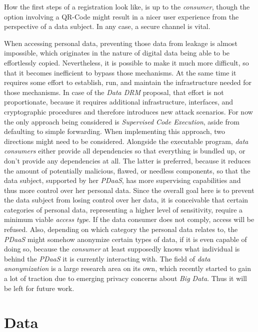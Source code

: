 \documentclass[12pt,english,a4paper,titlepage,cleardoublepage=empty,dottedtoc]{report}
\begin{document}
How the first steps of a registration look like, is up to the
\emph{consumer}, though the option involving a QR-Code might result in a
nicer user experience from the perspective of a data subject. In any
case, a secure channel is vital.

When accessing personal data, preventing those data from leakage is
almost impossible, which originates in the nature of digital data being
able to be effortlessly copied. Nevertheless, it is possible to make it
much more difficult, so that it becomes inefficient to bypass those
mechanisms. At the same time it requires some effort to establish, run,
and maintain the infrastructure needed for those mechanisms. In case of
the \emph{Data DRM} proposal, that effort is not proportionate, because
it requires additional infrastructure, interfaces, and cryptographic
procedures and therefore introduces new attack scenarios. For now the
only approach being considered is \emph{Supervised Code Execution},
aside from defaulting to simple forwarding. When implementing this
approach, two directions might need to be considered. Alongside the
executable program, \emph{data consumers} either provide all
dependencies so that everything is bundled up, or don't provide any
dependencies at all. The latter is preferred, because it reduces the
amount of potentially malicious, flawed, or needless components, so that
the data subject, supported by her \emph{PDaaS}, has more supervising
capabilities and thus more control over her personal data. Since the
overall goal here is to prevent the data subject from losing control
over her data, it is conceivable that certain categories of personal
data, representing a higher level of sensitivity, require a minimum
viable \emph{access type}. If the data consumer does not comply, access
will be refused. Also, depending on which category the personal data
relates to, the \emph{PDaaS} might somehow anonymize certain types of
data, if it is even capable of doing so, because the \emph{consumer} at
least supposedly knows what individual is behind the \emph{PDaaS} it is
currently interacting with. The field of \emph{data anonymization} is a
large research area on its own, which recently started to gain a lot of
traction due to emerging privacy concerns about \emph{Big Data}. Thus it
will be left for future work.

\hypertarget{data}{\section{Data}\label{data}}
\end{document}
